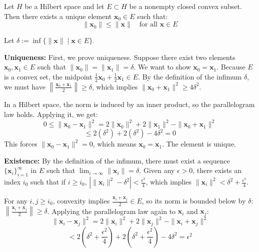 
\begin{theorem}
    Let $H$ be a Hilbert space and let $E \subset H$ be a nonempty closed convex subset. Then there exists a unique element $\mathbf{x}_0 \in E$ such that:
    \[ \|\mathbf{x}_0\| \le \|\mathbf{x}\| \quad \text{for all } \mathbf{x} \in E \]
\end{theorem}

\begin{pfbox}
    Let $\delta := \inf \{ \|\mathbf{x}\| \mid \mathbf{x} \in E \}$.

    \textbf{Uniqueness:} 
    First, we prove uniqueness. Suppose there exist two elements $\mathbf{x}_0, \mathbf{x}_1 \in E$ such that $\|\mathbf{x}_0\| = \|\mathbf{x}_1\| = \delta$. We want to show $\mathbf{x}_0 = \mathbf{x}_1$.
    Because $E$ is a convex set, the midpoint $\displaystyle \frac{1}{2}\mathbf{x}_0 + \frac{1}{2}\mathbf{x}_1 \in E$. 
    By the definition of the infimum $\delta$, we must have $\displaystyle \left\| \frac{\mathbf{x}_0 + \mathbf{x}_1}{2} \right\| \ge \delta$, which implies $\|\mathbf{x}_0 + \mathbf{x}_1\|^2 \ge 4\delta^2$.
    
    In a Hilbert space, the norm is induced by an inner product, so the parallelogram law holds. Applying it, we get:
    \[ 0 \le \|\mathbf{x}_0 - \mathbf{x}_1\|^2 = 2\|\mathbf{x}_0\|^2 + 2\|\mathbf{x}_1\|^2 - \|\mathbf{x}_0 + \mathbf{x}_1\|^2 \]
    \[ \le 2(\delta^2) + 2(\delta^2) - 4\delta^2 = 0 \]
    This forces $\|\mathbf{x}_0 - \mathbf{x}_1\|^2 = 0$, which means $\mathbf{x}_0 = \mathbf{x}_1$. The element is unique.

    \textbf{Existence:} 
    By the definition of the infimum, there must exist a sequence $\{\mathbf{x}_i\}_{i=1}^\infty$ in $E$ such that $\displaystyle \lim_{i \to \infty} \|\mathbf{x}_i\| = \delta$.
    Given any $\epsilon > 0$, there exists an index $i_0$ such that if $i \ge i_0$, $\displaystyle \left| \|\mathbf{x}_i\|^2 - \delta^2 \right| < \frac{\epsilon^2}{4}$, which implies $\displaystyle \|\mathbf{x}_i\|^2 < \delta^2 + \frac{\epsilon^2}{4}$.
    
    For any $i, j \ge i_0$, convexity implies $\displaystyle \frac{\mathbf{x}_i + \mathbf{x}_j}{2} \in E$, so its norm is bounded below by $\delta$: $\displaystyle \left\| \frac{\mathbf{x}_i + \mathbf{x}_j}{2} \right\| \ge \delta$.
    Applying the parallelogram law again to $\mathbf{x}_i$ and $\mathbf{x}_j$:
    \[ \|\mathbf{x}_i - \mathbf{x}_j\|^2 = 2\|\mathbf{x}_i\|^2 + 2\|\mathbf{x}_j\|^2 - \|\mathbf{x}_i + \mathbf{x}_j\|^2 \]
    \[ < 2\left(\delta^2 + \frac{\epsilon^2}{4}\right) + 2\left(\delta^2 + \frac{\epsilon^2}{4}\right) - 4\delta^2 = \epsilon^2 \]
    

\end{pfbox}
